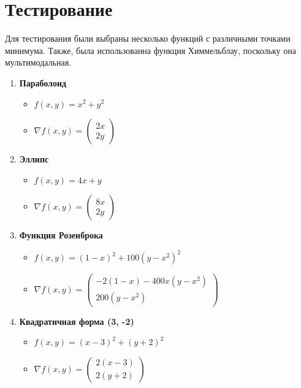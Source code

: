 \documentclass{article}
\begin{document}
\section{Тестирование}
Для тестирования были выбраны несколько функций с различными точками минимума. Также, была использованна функция Химмельблау, поскольку она мультимодальная.
\begin{enumerate}
  \item \textbf{Параболоид}
  \begin{itemize}
    \item \( f(x, y) = x^2 + y^2 \)
    \item \( \nabla f(x, y) = \begin{pmatrix} 2x \\ 2y \end{pmatrix} \)
  \end{itemize}

  \item \textbf{Эллипс}
  \begin{itemize}
    \item \( f(x, y) = 4x + y \)
    \item \( \nabla f(x, y) = \begin{pmatrix} 8x \\ 2y \end{pmatrix} \)
  \end{itemize}

  \item \textbf{Функция Розенброка}
  \begin{itemize}
    \item \( f(x, y) = (1 - x)^2 + 100(y - x^2)^2 \)
    \item \( \nabla f(x, y) = \begin{pmatrix}
      -2(1 - x) - 400x(y - x^2) \\
      200(y - x^2)
    \end{pmatrix} \)
  \end{itemize}

  \item \textbf{Квадратичная форма (3, -2)}
  \begin{itemize}
    \item \( f(x, y) = (x - 3)^2 + (y + 2)^2 \)
    \item \( \nabla f(x, y) = \begin{pmatrix}
      2(x - 3) \\
      2(y + 2)
    \end{pmatrix} \)
  \end{itemize}


\end{enumerate}
\end{document}
